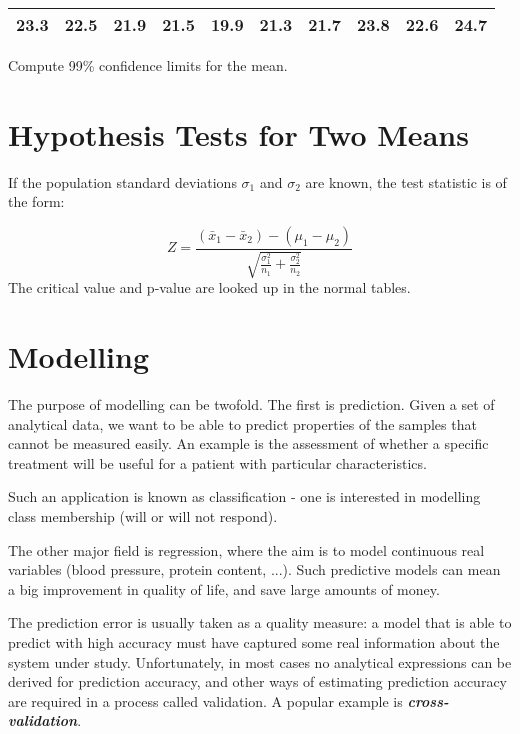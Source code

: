 \documentclass[14pt, a4paper]{article}
\theoremstyle{plain}
\theoremstyle{definition}
\theoremstyle{remark}
\begin{document}
\begin{tabular}{|c|c|c|c|c|c|c|c|c|c|}
  \hline
23.3 & 22.5 & 21.9 & 21.5 & 19.9 & 21.3 & 21.7 & 23.8 & 22.6 &
24.7\\
  \hline
\end{tabular}

Compute 99\% confidence limits for the mean.
\section{Hypothesis Tests for Two Means}

If the population standard deviations $\sigma_1$ and $\sigma_2$
are known, the test statistic is of the form:

\begin{equation}
Z = \frac{(\bar{x}_1 - \bar{x}_2) - (\mu_1 - \mu_2 ) }{\sqrt{
\frac{\sigma^2_1}{n_1}+\frac{\sigma^2_2}{n_2}} }
\end{equation}
The critical value and p-value are looked up in the normal tables.



\section{Modelling}

The purpose of modelling can be twofold. The first is prediction. Given a set of analytical data, we want to be able to predict properties of the samples that cannot be measured easily. An example is the assessment of whether a specific treatment will be useful for a patient with particular characteristics.

Such an application is known as classification - one is interested in modelling class membership (will or will not respond).

The other major field is regression, where the aim is to model continuous real variables (blood
pressure, protein content, ...). Such predictive models can mean a big improvement in quality of life, and save large amounts of money.

The prediction error is usually taken as a quality measure: a model that is able to predict with high
accuracy must have captured some real information about the system under study. Unfortunately, in most cases no analytical expressions can be derived for prediction accuracy, and other ways of estimating prediction accuracy are
required in a process called validation. A popular example is \textbf{\emph{cross-validation}}.
\end{document}

